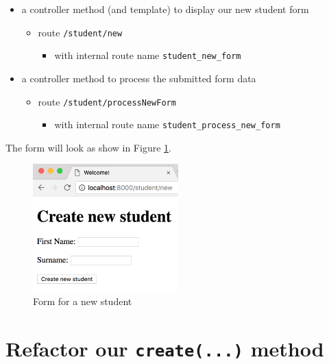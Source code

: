 \documentclass[a4paperpaper,openright]{book}
\providecommand{\tightlist}{%
  \setlength{\itemsep}{0pt}\setlength{\parskip}{0pt}}
\begin{document}
\begin{itemize}
\item
  a controller method (and template) to display our new student form

  \begin{itemize}
  \item
    route \texttt{/student/new}

    \begin{itemize}
    \tightlist
    \item
      with internal route name \texttt{student\_new\_form}
    \end{itemize}
  \end{itemize}
\item
  a controller method to process the submitted form data

  \begin{itemize}
  \item
    route \texttt{/student/processNewForm}

    \begin{itemize}
    \tightlist
    \item
      with internal route name \texttt{student\_process\_new\_form}
    \end{itemize}
  \end{itemize}
\end{itemize}

The form will look as show in Figure \ref{new_student_form}.

\begin{figure}
\centering
\includegraphics[width=0.5\textwidth,height=\textheight]{./tex2pdf.-51e064f4751cea0e/47fb9483958661b9823335391996ce0741d76a07.png}
\caption{Form for a new student \label{new_student_form}}
\end{figure}

\hypertarget{refactor-our-create...-method}{%
\section{\texorpdfstring{Refactor our \texttt{create(...)}
method}{Refactor our create(...) method}}\label{refactor-our-create...-method}}
\end{document}
